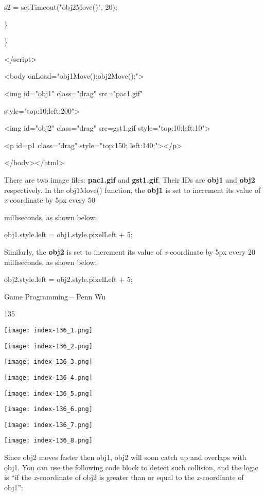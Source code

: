 \documentclass[
]{article}
\begin{document}
s2 = setTimeout("obj2Move()", 20);

\}

\}

\textless/script\textgreater{}

\textless body onLoad="obj1Move();obj2Move();"\textgreater{}

\textless img id="obj1" class="drag" src="pac1.gif"

style="top:10;left:200"\textgreater{}

\textless img id="obj2" class="drag"
src=\textquotesingle gst1.gif\textquotesingle{}
style="top:10;left:10"\textgreater{}

\textless p id=p1 class="drag" style="top:150;
left:140;"\textgreater\textless/p\textgreater{}

\textless/body\textgreater\textless/html\textgreater{}

There are two image files: \textbf{pac1.gif} and \textbf{gst1.gif}.
Their IDs are \textbf{obj1} and \textbf{obj2} respectively. In the
obj1Move() function, the \textbf{obj1} is set to increment its value of
\emph{x}-coordinate by 5px every 50

milliseconds, as shown below:

obj1.style.left = obj1.style.pixelLeft + 5;

Similarly, the \textbf{obj2} is set to increment its value of
\emph{x}-coordinate by 5px every 20 milliseconds, as shown below:

obj2.style.left = obj2.style.pixelLeft + 5;

Game Programming -- Penn Wu

135

\protect\hypertarget{index_split_009.htmlux5cux23p136}{}{}\texttt{[image: index-136\_1.png]}

\texttt{[image: index-136\_2.png]}

\texttt{[image: index-136\_3.png]}

\texttt{[image: index-136\_4.png]}

\texttt{[image: index-136\_5.png]}

\texttt{[image: index-136\_6.png]}

\texttt{[image: index-136\_7.png]}

\texttt{[image: index-136\_8.png]}

Since obj2 moves faster then obj1, obj2 will soon catch up and overlaps
with obj1. You can use the following code block to detect such
collision, and the logic is ``if the \emph{x}-coordinate of obj2 is
greater than or equal to the \emph{x}-coordinate of obj1'':
\end{document}
